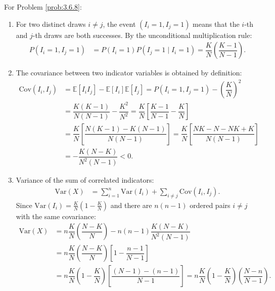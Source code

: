 \begin{solucion}
	\label{sol:3.6.8}
	For Problem \ref{prob:3.6.8}:
	\begin{enumerate}
		\item For two distinct draws $i \neq j$, the event $(I_i = 1, I_j = 1)$ means that the $i$-th and $j$-th draws are both successes. By the unconditional multiplication rule:
		\begin{align*}
			P(I_i = 1, I_j = 1) &= P(I_i = 1) P(I_j = 1 \mid I_i = 1) = \dfrac{K}{N} \left(\dfrac{K-1}{N-1}\right).
		\end{align*}
		\item The covariance between two indicator variables is obtained by definition:
		\begin{align*}
			\text{Cov}(I_i, I_j) &= \mathbb{E}[I_i I_j] - \mathbb{E}[I_i]\mathbb{E}[I_j] = P(I_i = 1, I_j = 1) - \left(\dfrac{K}{N}\right)^2 \\
			&= \dfrac{K(K-1)}{N(N-1)} - \dfrac{K^2}{N^2} = \dfrac{K}{N} \left[ \dfrac{K-1}{N-1} - \dfrac{K}{N} \right] \\
			&= \dfrac{K}{N} \left[ \dfrac{N(K-1) - K(N-1)}{N(N-1)} \right] = \dfrac{K}{N} \left[ \dfrac{NK - N - NK + K}{N(N-1)} \right] \\
			&= -\dfrac{K(N-K)}{N^2(N-1)} < 0.
		\end{align*}
		\item Variance of the sum of correlated indicators:
		\begin{align*}
			\text{Var}(X) &= \sum_{i=1}^n \text{Var}(I_i) + \sum_{i \neq j} \text{Cov}(I_i, I_j).
		\end{align*}
		Since $\text{Var}(I_i) = \frac{K}{N}\left(1 - \frac{K}{N}\right)$ and there are $n(n-1)$ ordered pairs $i \neq j$ with the same covariance:
		\begin{align*}
			\text{Var}(X) &= n \dfrac{K}{N}\left(\dfrac{N-K}{N}\right) - n(n-1) \dfrac{K(N-K)}{N^2(N-1)} \\
			&= n \dfrac{K}{N}\left(\dfrac{N-K}{N}\right) \left[ 1 - \dfrac{n-1}{N-1} \right] \\
			&= n \dfrac{K}{N}\left(1 - \dfrac{K}{N}\right) \left[ \dfrac{(N-1) - (n-1)}{N-1} \right] = n \dfrac{K}{N}\left(1 - \dfrac{K}{N}\right) \left(\dfrac{N-n}{N-1}\right).
		\end{align*}
	\end{enumerate}
\end{solucion}

